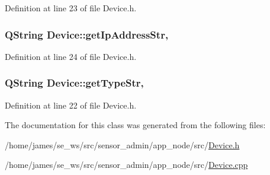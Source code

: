 Definition at line 23 of file Device.\-h.

\hypertarget{class_device_a96b05a2919e6d6699db607c81bf2183f}{
\subsubsection[{get\-Ip\-Address\-Str}]{\setlength{\rightskip}{0pt plus 5cm}Q\-String Device\-::get\-Ip\-Address\-Str\hspace{0.3cm}{\ttfamily [read]}, {\ttfamily [write]}}}\label{class_device_a96b05a2919e6d6699db607c81bf2183f}


Definition at line 24 of file Device.\-h.

\hypertarget{class_device_a5559b107a60c86b201dc8e92edadef1f}{
\subsubsection[{get\-Type\-Str}]{\setlength{\rightskip}{0pt plus 5cm}Q\-String Device\-::get\-Type\-Str\hspace{0.3cm}{\ttfamily [read]}, {\ttfamily [write]}}}\label{class_device_a5559b107a60c86b201dc8e92edadef1f}


Definition at line 22 of file Device.\-h.



The documentation for this class was generated from the following files\-:\begin{DoxyCompactItemize}
\item 
/home/james/se\-\_\-ws/src/sensor\-\_\-admin/app\-\_\-node/src/\hyperlink{app__node_2src_2_device_8h}{Device.\-h}\item 
/home/james/se\-\_\-ws/src/sensor\-\_\-admin/app\-\_\-node/src/\hyperlink{app__node_2src_2_device_8cpp}{Device.\-cpp}\end{DoxyCompactItemize}
